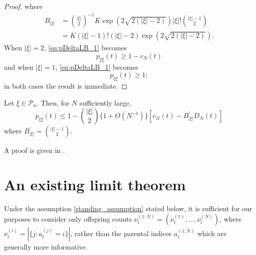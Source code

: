 \begin{proof}
where
\begin{align*}
B_{|\xi|} 
&= \binom{|\xi|}{2}^{-1} K \exp( 2 \sqrt{2(|\xi|-2)} ) |\xi|! \binom{ |\xi|-1}{2} \\
&= K (|\xi|-1)! (|\xi|-2) \exp( 2 \sqrt{2(|\xi|-2)} ) .
\end{align*}
When $|\xi| = 2$, \eqref{eq:pDeltaLB_1} becomes 
\begin{equation*}
p_{ \xi \xi }( t )
\geq 1 - c_N(t)
\end{equation*}
and when $|\xi| = 1$, 
\eqref{eq:pDeltaLB_1} becomes 
\begin{equation*}
p_{ \xi \xi }( t )
\geq 1 ;
\end{equation*}
in both cases the result is immediate.
\end{proof}


\begin{prop}%
\label{thm:pDelta_UB}
Let $\xi \in \mathcal{P}_n$. Then, for $N$ sufficiently large,
\begin{equation*}
p_{\xi\xi}(t)
\leq 1 - \binom{|\xi|}{2} \{ 1 + O(N^{-1}) \} 
        \left[ c_N(t) - B_{|\xi|}^\prime D_N(t) \right]
\end{equation*}
where $B_{|\xi|}^\prime = \binom{|\xi|-1}{2}$.
\end{prop}

A proof is given in \textcite[Lemma 1 Case 1]{koskela2018}.





\section{An existing limit theorem}
Under the assumption \ref{standing_assumption} stated below, it is sufficient for our purposes to consider only offspring counts $\nu_t^{(1:N)} = (\nu_t^{(1)},\dots,\nu_t^{(N)})$, where $\nu_t^{(i)} = |\{ j: a_t^{(j)} =i \}|$, rather than the parental indices $a_t^{(1:N)}$ which are generally more informative.


